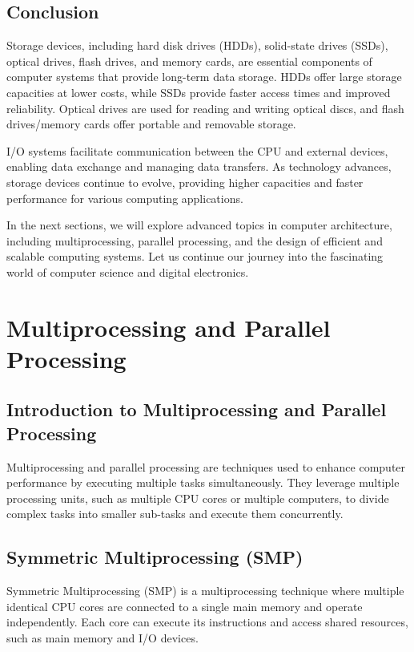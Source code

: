 \documentclass{article}
\begin{document}
\subsection{Conclusion}

Storage devices, including hard disk drives (HDDs), solid-state drives (SSDs), optical drives, flash drives, and memory cards, are essential components of computer systems that provide long-term data storage. HDDs offer large storage capacities at lower costs, while SSDs provide faster access times and improved reliability. Optical drives are used for reading and writing optical discs, and flash drives/memory cards offer portable and removable storage.

I/O systems facilitate communication between the CPU and external devices, enabling data exchange and managing data transfers. As technology advances, storage devices continue to evolve, providing higher capacities and faster performance for various computing applications.

In the next sections, we will explore advanced topics in computer architecture, including multiprocessing, parallel processing, and the design of efficient and scalable computing systems. Let us continue our journey into the fascinating world of computer science and digital electronics.

\newpage

\section{Multiprocessing and Parallel Processing}

\subsection{Introduction to Multiprocessing and Parallel Processing}

Multiprocessing and parallel processing are techniques used to enhance computer performance by executing multiple tasks simultaneously. They leverage multiple processing units, such as multiple CPU cores or multiple computers, to divide complex tasks into smaller sub-tasks and execute them concurrently.

\subsection{Symmetric Multiprocessing (SMP)}

Symmetric Multiprocessing (SMP) is a multiprocessing technique where multiple identical CPU cores are connected to a single main memory and operate independently. Each core can execute its instructions and access shared resources, such as main memory and I/O devices.
\end{document}

